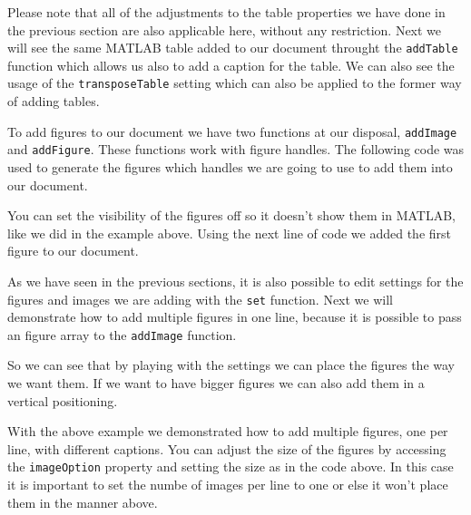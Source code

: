 
Please note that all of the adjustments to the table properties we have done in the previous section are also applicable 
here, without any restriction. Next we will see the same MATLAB table added to our document throught the {\tt addTable} 
function which allows us also to add a caption for the table. We can also see the usage of the {\tt transposeTable} setting
which can also be applied to the former way of adding tables.


To add figures to our document we have two functions at our disposal, {\tt addImage} and {\tt addFigure}. These functions work
with figure handles. The following code was used to generate the figures which handles we are going to use to add them into 
our document.


You can set the visibility of the figures off so it doesn't show them in MATLAB, like we did in the example above. Using the 
next line of code we added the first figure to our document.


As we have seen in the previous sections, it is also possible to edit settings for the figures and images we are adding with
the {\tt set} function. Next we will demonstrate how to add multiple figures in one line, because it is possible to pass an 
figure array to the {\tt addImage} function.


So we can see that by playing with the settings we can place the figures the way we want them. If we want to have bigger 
figures we can also add them in a vertical positioning.


With the above example we demonstrated how to add multiple figures, one per line, with different captions. You can adjust
the size of the figures by accessing the {\tt imageOption} property and setting the size as in the code above. In this case it
is important to set the numbe of images per line to one or else it won't place them in the manner above.







